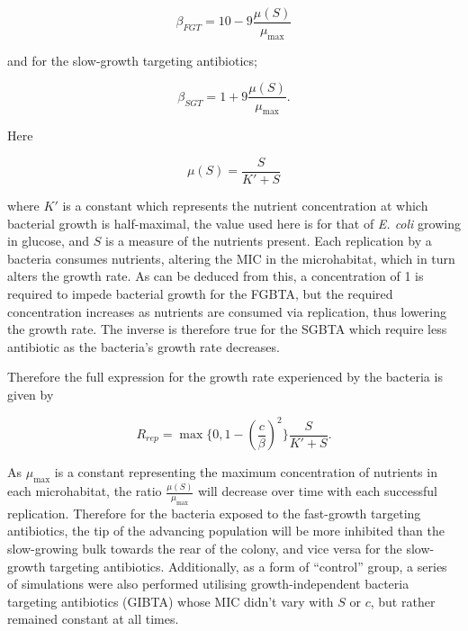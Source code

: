\documentclass[a4paper,12pt]{article}
\begin{document}
\begin{equation}
 \beta_{FGT} =  10 - 9\frac{\mu(S)}{\mu_{\max}}
 \label{eqn:fast-growth-beta}
\end{equation}

and for the slow-growth targeting antibiotics;

\begin{equation}
 \beta_{SGT} = 1 + 9\frac{\mu(S)}{\mu_{\max}}.
 \label{eqn:slow-growth-beta}
\end{equation}


Here 

\begin{equation}
 \mu(S) = \frac{S}{K' + S}
\end{equation}

where $K'$ is a constant which represents the nutrient concentration at which bacterial growth is half-maximal, the value used here is for that of \textit{E. coli} 
growing in glucose, and $S$ is a measure of the nutrients present.  Each replication by a bacteria consumes nutrients, altering the MIC in the microhabitat, 
which in turn alters the growth rate.  As can be deduced from this, a concentration of 1 is required to impede bacterial growth for the FGBTA, but the required concentration 
increases as nutrients are consumed via replication, thus lowering the growth rate.  The inverse is therefore true for the SGBTA which require less antibiotic as the bacteria's 
growth rate decreases.

Therefore the full expression for the growth rate experienced by the bacteria is given by 

\begin{equation}
 R_{rep} = \max\{0, 1 - (\frac{c}{\beta})^2\}\frac{S}{K' + S}.
\end{equation}


As $\mu_{\max}$ is a constant representing the maximum concentration of nutrients in each microhabitat, the ratio $\frac{\mu(S)}{\mu_{\max}}$ 
will decrease over time with each successful replication.  Therefore for the bacteria exposed to the fast-growth targeting antibiotics, the tip of the advancing population will be 
more inhibited than the slow-growing bulk towards the rear of the colony, and vice versa for the slow-growth targeting antibiotics.  Additionally, as a form of ``control'' group, 
a series of simulations were also performed utilising 
growth-independent bacteria targeting antibiotics (GIBTA) whose MIC didn't vary with $S$ or $c$, but rather remained constant at all times.
\end{document}
